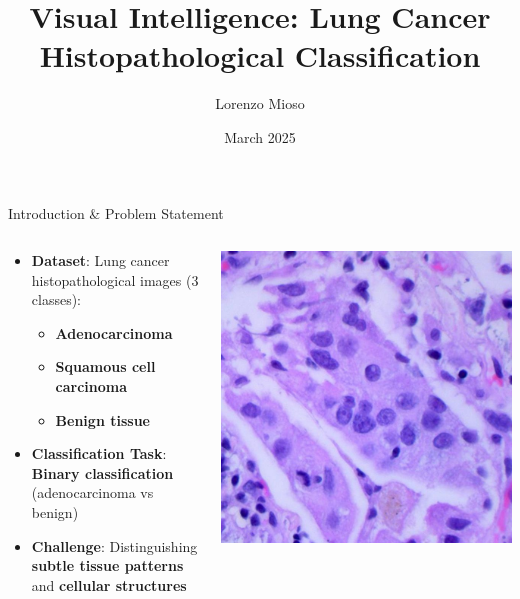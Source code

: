 \documentclass[aspectratio=169,8pt]{beamer}  %
\title{Visual Intelligence: Lung Cancer Histopathological Classification}
\author{Lorenzo Mioso}
\date{March 2025}
\begin{document}
\begin{frame}
\titlepage
\end{frame}

\begin{frame}{Introduction \& Problem Statement}
\begin{columns}[T]
\begin{column}{0.5\textwidth}
\begin{itemize}
\item \textbf{Dataset}: Lung cancer histopathological images (3 classes):
  \begin{itemize}
  \item \textbf{Adenocarcinoma}
  \item \textbf{Squamous cell carcinoma}
  \item \textbf{Benign tissue}
  \end{itemize}
\item \textbf{Classification Task}: \textbf{Binary classification} (adenocarcinoma vs benign)
\item \textbf{Challenge}: Distinguishing \textbf{subtle tissue patterns} and \textbf{cellular structures}
\end{itemize}
\end{column}
\begin{column}{0.5\textwidth}
\hfill\includegraphics[width=0.95\linewidth, height=0.45\textheight]{imgs/adenocarcinoma.jpg}

\end{column}
\end{columns}
\end{frame}
\end{document}
